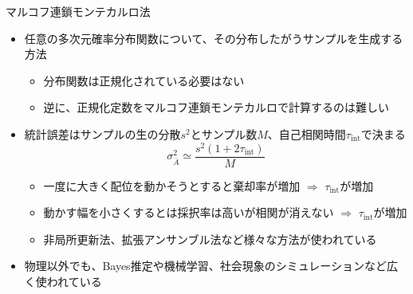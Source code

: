 
\begin{frame}[t,fragile]{マルコフ連鎖モンテカルロ法}
  \begin{itemize}
  \item 任意の多次元確率分布関数について、その分布したがうサンプルを生成する方法
    \begin{itemize}
    \item 分布関数は正規化されている必要はない
    \item 逆に、正規化定数をマルコフ連鎖モンテカルロで計算するのは難しい
    \end{itemize}
  \item 統計誤差はサンプルの生の分散$s^2$とサンプル数$M$、自己相関時間$\tau_\text{int}$で決まる
    \[
    \sigma^2_{\overline{A}} \simeq \frac{s^2 (1+2\tau_\text{int})}{M}
    \]
    \begin{itemize}
    \item 一度に大きく配位を動かそうとすると棄却率が増加 $\Rightarrow$ $\tau_\text{int}$が増加
    \item 動かす幅を小さくするとは採択率は高いが相関が消えない $\Rightarrow$ $\tau_\text{int}$が増加
    \item 非局所更新法、拡張アンサンブル法など様々な方法が使われている
    \end{itemize}
  \item 物理以外でも、Bayes推定や機械学習、社会現象のシミュレーションなど広く使われている
  \end{itemize}
\end{frame}
